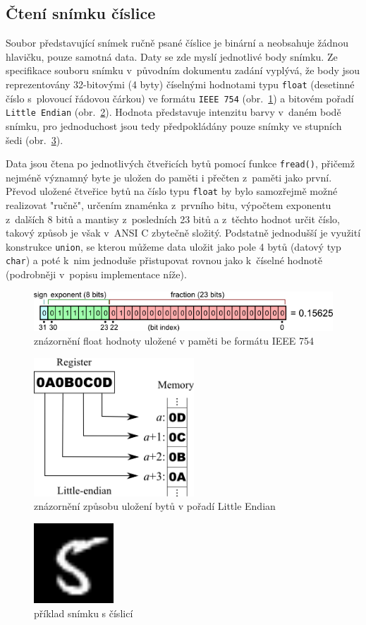 \documentclass[12pt, a4paper, titlepage]{report}
\begin{document}
\subsection{Čtení snímku číslice}
Soubor představující snímek ručně psané číslice je binární a neobsahuje žádnou hlavičku, pouze samotná data. Daty se zde myslí jednotlivé body snímku. Ze specifikace souboru snímku v~původním dokumentu zadání vyplývá, že body jsou reprezentovány 32-bitovými (4 byty) číselnými hodnotami typu \texttt{float} (desetinné číslo s~plovoucí řádovou čárkou) ve formátu \texttt{IEEE 754} (obr.~\ref{fig:ieee}) a bitovém pořadí \texttt{Little Endian} (obr.~\ref{fig:le}). Hodnota představuje intenzitu barvy v~daném bodě snímku, pro jednoduchost jsou tedy předpokládány pouze snímky ve stupních šedi (obr.~\ref{fig:digit}). \par
Data jsou čtena po jednotlivých čtveřicích bytů pomocí funkce \texttt{fread()}, přičemž nejméně významný byte je uložen do paměti i přečten z~paměti jako první. Převod uložené čtveřice bytů na číslo typu \texttt{float} by bylo samozřejmě možné realizovat "ručně", určením znaménka z~prvního bitu, výpočtem exponentu z~dalších 8 bitů a mantisy z~posledních 23 bitů a z~těchto hodnot určit číslo, takový způsob je však v~ANSI C zbytečně složitý. Podstatně jednodušší je využití konstrukce \texttt{union}, se kterou můžeme data uložit jako pole 4 bytů (datový typ \texttt{char}) a poté k~nim jednoduše přistupovat rovnou jako k~číselné hodnotě (podrobněji v~popisu implementace níže).
\begin{figure}[htbp]
    \centering
    \includegraphics[width=12cm]{img/ieee.png}
    \caption{znázornění float hodnoty uložené v paměti be formátu IEEE 754}
    \label{fig:ieee}
\end{figure}
\begin{figure}[htbp]
    \centering
    \includegraphics[width=6cm]{img/le.png}
    \caption{znázornění způsobu uložení bytů v pořadí Little Endian}
    \label{fig:le}
\end{figure}
\begin{figure}[htbp]
    \centering
    \includegraphics[width=3cm]{img/digit.png}
    \caption{příklad snímku s číslicí}
    \label{fig:digit}
\end{figure}
\end{document}
